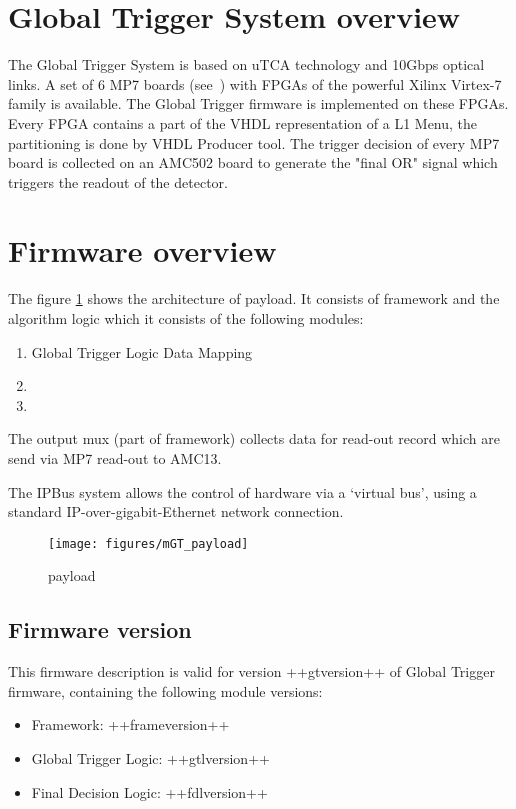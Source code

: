 \section{Global Trigger System overview}\label{sec:gt_system}

The Global Trigger System is based on uTCA technology and 10Gbps optical links. A set of 6 MP7 boards (see~\cite{MP7}) with FPGAs of the powerful Xilinx Virtex-7 family is available. The Global Trigger firmware is implemented on these FPGAs. Every FPGA contains a part of the VHDL representation of a L1 Menu, the partitioning is done by VHDL Producer tool. The trigger decision of every MP7 board is collected on an AMC502 board to generate the "final OR" signal which triggers the readout of the detector.

\section{Firmware overview}\label{sec:fw}
The figure \ref{fig:mgt} shows the architecture of \ugt payload. It consists of framework and the algorithm logic which it consists of the following modules:
\begin{enumerate}
\item Global Trigger Logic Data Mapping
\item \ugtl
\item \ufdl
\end{enumerate}

The output mux (part of framework) collects data for read-out record which are send via MP7 read-out to AMC13.

The IPBus system allows the control of hardware via a ‘virtual bus’, using a standard IP-over-gigabit-Ethernet network connection.
\begin{figure}[h!]
   \centering
    \texttt{[image: figures/mGT\_payload]}
    \caption{\ugt payload}\label{fig:mgt}
 \end{figure}

\subsection{Firmware version}\label{sec:fw_version}

This firmware description is valid for version ++gtversion++ of Global Trigger firmware, containing the following module versions:
\begin{itemize}
\item Framework: ++frameversion++
\item Global Trigger Logic: ++gtlversion++
\item Final Decision Logic: ++fdlversion++
\end{itemize}

